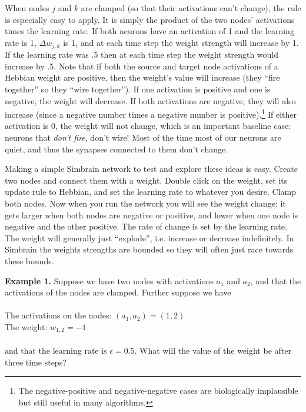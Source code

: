 When nodes $j$ and $k$ are clamped (so that their activations can't change), the rule is especially easy to apply. It is simply the product of the two nodes' activations times the learning rate. If both neurons have an activation of 1 and the learning rate is 1, $\Delta w_{j,k}$ is 1, and at each time step the weight strength will increase by 1. If the learning rate was .5 then at each time step the weight strength would increase by .5. Note that if both the source and target node activations of a Hebbian weight are positive, then the weight's value will increase (they ``fire together'' so they ``wire together''). If one activation is positive and one is negative, the weight will decrease. If both activations are negative, they will also increase (since a negative number times a negative number is positive).\footnote{The negative-positive and negative-negative cases are biologically implausible but still useful in many algorithms.}  If either activation is 0, the weight will not change, which is an important baseline case: neurons that \emph{don't fire}, don't wire! Most of the time most of our neurons are quiet, and thus the synapses connected to them don't change. 

Making a simple Simbrain network to test and explore these ideas is easy. Create two nodes and connect them with a weight. Double click on the weight, set its update rule to Hebbian, and set the learning rate to whatever you desire. Clamp both nodes. Now when you run the network you will see the weight change: it gets larger when both nodes are negative or positive, and lower when one node is negative and the other positive. The rate of change is set by the learning rate. The weight will generally just ``explode'', i.e. increase or decrease indefinitely. In Simbrain the weights strengths are bounded so they will often just race towards these bounds. 


\bigskip

\noindent
{\bf Example 1.} Suppose we have two nodes with activations $a_1$ and $a_2$, and that the activations of the nodes are clamped. Further suppose we have \\ \\
\indent \qquad\qquad The activations on the nodes: $(a_1,a_2) = (1,2)$\\
\indent \qquad\qquad The weight: $w_{1,2} = -1$ \\ \\
and that the learning rate is $\epsilon =0.5$. What will the value of the  weight be after three time steps? 

